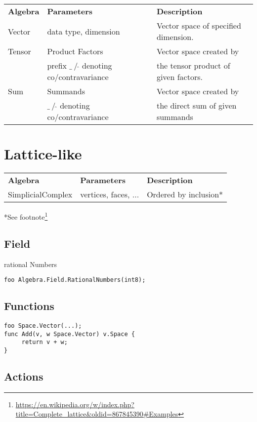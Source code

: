 \documentclass{amsbook}
\begin{document}
\begin{tabular}{lll}
  \textbf{Algebra} & \textbf{Parameters} & \textbf{Description} \\
  Vector & data type, dimension & Vector space of specified dimension.\\
  Tensor & Product Factors & Vector space created by \\
  & prefix $\_~/~\hat{}$  denoting co/contravariance & the tensor product of given factors.\\
  Sum & Summands & Vector space created by \\
   & $\_~/~\hat{}$  denoting co/contravariance & the direct sum of given summands\\
\end{tabular}

\section{Lattice-like}

\begin{tabular}{lll}
  \textbf{Algebra} & \textbf{Parameters} & \textbf{Description} \\
  SimplicialComplex & vertices, faces, ... & Ordered by inclusion*
\end{tabular}

*See footnote\footnote{\url{https://en.wikipedia.org/w/index.php?title=Complete_lattice&oldid=867845390\#Examples}}

\subsection{Field}
rational Numbers

\begin{verbatim}
foo Algebra.Field.RationalNumbers(int8);
\end{verbatim}

\subsection{Functions}

\begin{verbatim}
foo Space.Vector(...);
func Add(v, w Space.Vector) v.Space {
     return v + w;
}
\end{verbatim}

\subsection{Actions}
\end{document}
